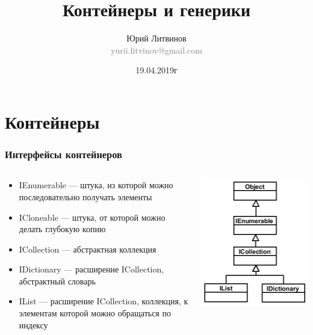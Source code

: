 \documentclass[xetex,mathserif,serif]{beamer}
\title{Контейнеры и генерики}
\author[Юрий Литвинов]{Юрий Литвинов\\\small{\textcolor{gray}{yurii.litvinov@gmail.com}}}
\date{19.04.2019г}
\begin{document}
	\frame{\titlepage}

	\section{Контейнеры}

	\begin{frame}
		\frametitle{Интерфейсы контейнеров}
		\begin{columns}
			\begin{column}{0.65\textwidth}
				\begin{itemize}
					\item IEnumerable --- штука, из которой можно последовательно получать элементы
					\item ICloneable --- штука, от которой можно делать глубокую копию
					\item ICollection --- абстрактная коллекция
					\item IDictionary --- расширение ICollection, абстрактный словарь
					\item IList --- расширение ICollection, коллекция, к элементам которой можно обращаться по индексу
				\end{itemize}
			\end{column}
			\begin{column}{0.3\textwidth}
				\includegraphics[width=\textwidth]{interfaces.png}
			\end{column}
		\end{columns}
	\end{frame}
\end{document}
